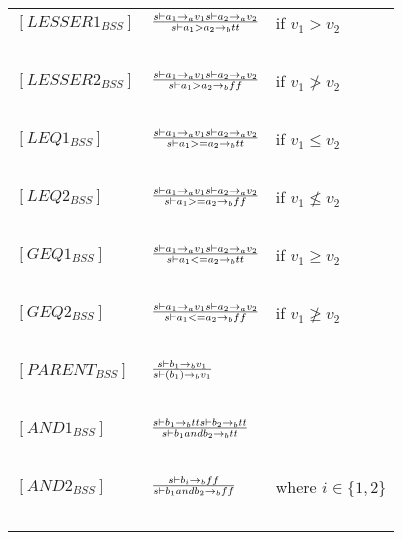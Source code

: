 \begin{table}[h]
\begin{tabular}{|l|l|l|}
	$[LESSER1_{BSS}]$	& $s \vdash a_{1} \rightarrow_{a} v_{1}  s \vdash a_{2} \rightarrow_{a} v_{2} \over s \vdash a_{1} > a_{2} \rightarrow_{b} tt$			& if $v_{1} > v_{2}$ \\
			~			&															~																			& ~ \\
	$[LESSER2_{BSS}]$	& $s \vdash a_{1} \rightarrow_{a} v_{1}  s \vdash a_{2} \rightarrow_{a} v_{2} \over s \vdash a_{1} > a_{2} \rightarrow_{b} ff$			& if $v_{1} \not> v_{2}$ \\
			~			&															~																			& ~ \\
	$[LEQ1_{BSS}]$		& $s \vdash a_{1} \rightarrow_{a} v_{1}  s \vdash a_{2} \rightarrow_{a} v_{2} \over s \vdash a_{1} >= a_{2} \rightarrow_{b} tt$			& if $v_{1} \leq v_{2}$ \\
			~			&															~																			& ~ \\
	$[LEQ2_{BSS}]$		& $s \vdash a_{1} \rightarrow_{a} v_{1}  s \vdash a_{2} \rightarrow_{a} v_{2} \over s \vdash a_{1} >= a_{2} \rightarrow_{b} ff$			& if $v_{1} \not\leq v_{2}$ \\
			~			&															~																			& ~ \\
	$[GEQ1_{BSS}]$		& $s \vdash a_{1} \rightarrow_{a} v_{1}  s \vdash a_{2} \rightarrow_{a} v_{2} \over s \vdash a_{1} <= a_{2} \rightarrow_{b} tt$			& if $v_{1} \geq v_{2}$ \\
			~			&															~																			& ~ \\
	$[GEQ2_{BSS}]$		& $s \vdash a_{1} \rightarrow_{a} v_{1}  s \vdash a_{2} \rightarrow_{a} v_{2} \over s \vdash a_{1} <= a_{2} \rightarrow_{b} ff$			& if $v_{1} \not\geq v_{2}$ \\
			~			&															~																			& ~ \\
	$[PARENT_{BSS}]$	& $s \vdash b_{1} \rightarrow_{b} v_{1} \over s \vdash (b_{1}) \rightarrow_{b} v_{1}$													& ~ \\
			~			&															~																			& ~ \\
	$[AND1_{BSS}]$		& $s \vdash b_{1} \rightarrow_{b} tt  s \vdash b_{2} \rightarrow_{b} tt \over s \vdash b_{1} and b_{2} \rightarrow_{b} tt$				& ~ \\
			~			&															~																			& ~ \\
	$[AND2_{BSS}]$		& $s \vdash b_{i} \rightarrow_{b} ff \over s \vdash b_{1} and b_{2} \rightarrow_{b} ff$													& where $i \in \{1,2\}$ \\
			~			&															~																			& ~ \\

\end{tabular}
\end{table}
